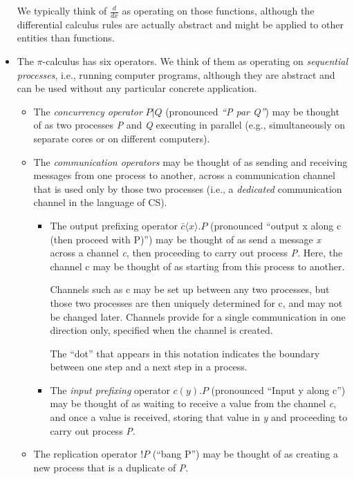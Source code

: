 \documentclass[letterpaper,10pt,openany,oneside]{sphinxmanual}
\begin{document}
\begin{itemize}
We typically think of $\frac{d}{dx}$ as operating on those functions, although the differential calculus rules are actually abstract and might be applied to other entities than functions.

\item {} 
The $\pi$-calculus has six operators. We think of them as operating on \emph{sequential processes}, i.e., running computer programs, although they are abstract and can be used without any particular concrete application.
\begin{itemize}
\item {} 
The \emph{concurrency operator} $P|Q$ (pronounced \emph{``P par Q''}) may be thought of as two processes \emph{P} and \emph{Q} executing in parallel (e.g., simultaneously on separate cores or on different computers).

\item {} 
The \emph{communication operators} may be thought of as sending and receiving messages from one process to another, across a communication channel that is used only by those two processes (i.e., a \emph{dedicated} communication channel in the language of CS).
\begin{itemize}
\item {} 
The output prefixing operator $\bar{c} \langle x \rangle . P$ (pronounced ``output x along c (then proceed with P)'') may be thought of as send a message \emph{x} across a channel \emph{c}, then proceeding to carry out process \emph{P}. Here, the channel c may be thought of as starting from this process to another.

Channels such as c may be set up between any two processes, but those two processes are then uniquely determined for c, and may not be changed later. Channels provide for a single communication in one direction only, specified when the channel is created.

The ``dot'' that appears in this notation indicates the boundary between one step and a next step in a process.

\item {} 
The \emph{input prefixing} operator $c(y).P$ (pronounced ``Input y along c'') may be thought of as waiting to receive a value from the channel \emph{c}, and once a value is received, storing that value in \emph{y} and proceeding to carry out process \emph{P}.

\end{itemize}

\item {} 
The replication operator $!P$ (``bang P'') may be thought of as creating a new process that is a duplicate of \emph{P}.


\end{itemize}
\end{itemize}
\end{document}
